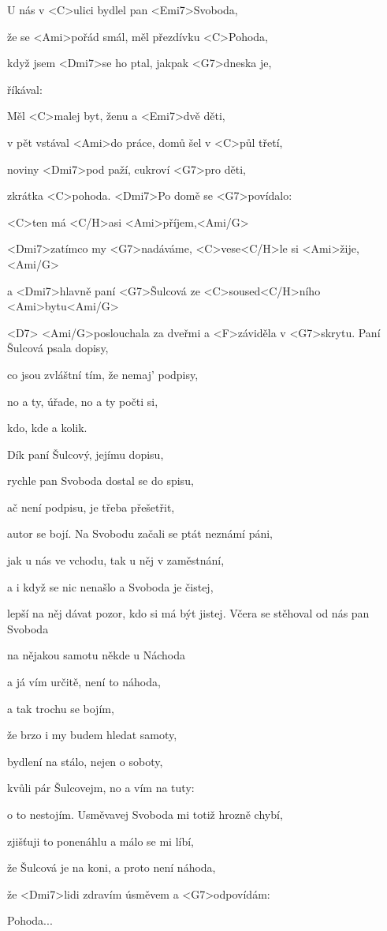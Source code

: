 

\zs
U nás v <C>ulici bydlel pan <Emi7>Svoboda, 

že se <Ami>pořád smál, měl přezdívku <C>Pohoda, 

když jsem <Dmi7>se ho ptal, jakpak <G7>dneska je, 

říkával:  

Měl <C>malej byt, ženu a <Emi7>dvě děti,

v pět vstával <Ami>do práce, domů šel v <C>půl třetí, 

noviny <Dmi7>pod paží, cukroví <G7>pro děti, 

zkrátka <C>pohoda. 
\ks
\zr
<Dmi7>Po domě se <G7>povídalo: 

<C>ten má <C/H>asi <Ami>příjem,<Ami/G> 

<Dmi7>zatímco my <G7>nadáváme, <C>vese<C/H>le si <Ami>žije,<Ami/G>

a <Dmi7>hlavně paní <G7>Šulcová ze <C>soused<C/H>ního <Ami>bytu<Ami/G>

<D7> <Ami/G>poslouchala za dveřmi a <F>záviděla v <G7>skrytu. 
\kr
\zs
Paní Šulcová psala dopisy, 

co jsou zvláštní tím, že nemaj' podpisy, 

no a ty, úřade, no a ty počti si, 

kdo, kde a kolik.

Dík paní Šulcový, jejímu dopisu,

rychle pan Svoboda dostal se do spisu, 

ač není podpisu, je třeba přešetřit, 

autor se bojí. 
\ks
\zr
Na Svobodu začali se ptát neznámí páni, 

jak u nás ve vchodu, tak u něj v zaměstnání, 

a i když se nic nenašlo a Svoboda je čistej, 

lepší na něj dávat pozor, kdo si má být jistej. 
\kr
\zs
Včera se stěhoval od nás pan Svoboda 

na nějakou samotu někde u Náchoda 

a já vím určitě, není to náhoda, 

a tak trochu se bojím, 

že brzo i my budem hledat samoty, 

bydlení na stálo, nejen o soboty, 

kvůli pár Šulcovejm, no a vím na tuty: 

o to nestojím. 
\ks
\zr
Usměvavej Svoboda mi totiž hrozně chybí, 

zjišťuji to ponenáhlu a málo se mi líbí, 

že Šulcová je na koni, a proto není náhoda, 

že <Dmi7>lidi zdravím úsměvem a <G7>odpovídám: 

Pohoda...
\kr
\kp
